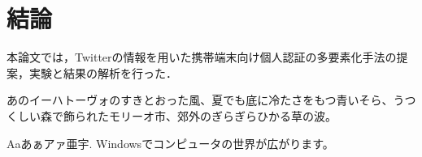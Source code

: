 \chapter{結論}\label{chap:conclusion}
本論文では，Twitterの情報を用いた携帯端末向け個人認証の多要素化手法の提案，実験と結果の解析を行った．

あのイーハトーヴォのすきとおった風、夏でも底に冷たさをもつ青いそら、うつくしい森で飾られたモリーオ市、郊外のぎらぎらひかる草の波。

Aaあぁアァ亜宇. Windowsでコンピュータの世界が広がります。

\newpage
